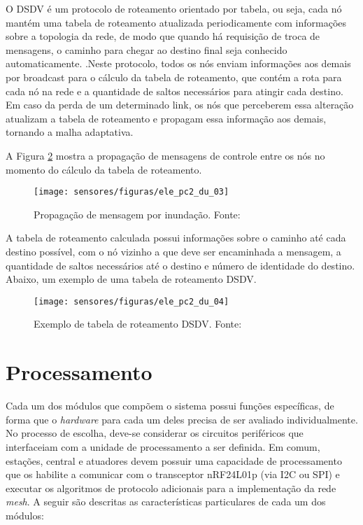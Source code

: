 O DSDV é um protocolo de roteamento orientado por tabela, ou seja, cada nó mantém uma tabela de roteamento atualizada periodicamente com informações sobre a topologia da rede, de modo que quando há requisição de troca de mensagens, o caminho para chegar ao destino final seja conhecido automaticamente.
\cite{bib_ele_du_3}.Neste protocolo, todos os nós enviam informações aos demais por broadcast para o cálculo da tabela de roteamento, que contém a rota para cada nó na rede e a quantidade de saltos necessários para atingir cada destino. Em caso da perda de um determinado link, os nós que perceberem essa alteração atualizam a tabela de roteamento e propagam essa informação aos demais, tornando a malha adaptativa.


A Figura \ref{ele_pc2_du_03} mostra a propagação de mensagens de controle entre os nós no momento do cálculo da tabela de roteamento.


\begin{figure}
\centering
\texttt{[image: sensores/figuras/ele\_pc2\_du\_03]}
\caption{Propagação de mensagem por inundação. Fonte:\cite{bib_ele_du_3}}
\label{ele_pc2_du_03}
\end{figure}


A tabela de roteamento calculada possui informações sobre o caminho até cada destino possível, com o nó vizinho a que deve ser encaminhada a mensagem, a quantidade de saltos necessários até o destino e número de identidade do destino. Abaixo, um exemplo de uma tabela de roteamento DSDV.



\begin{figure}
\centering
\texttt{[image: sensores/figuras/ele\_pc2\_du\_04]}
\caption{Exemplo de tabela de roteamento DSDV. Fonte:\cite{bib_ele_du_3}}
\label{ele_pc2_du_03}
\end{figure}


\section{Processamento}
		
	Cada um dos módulos que compõem o sistema possui funções específicas, de forma que o \emph{hardware} para cada um deles precisa de ser avaliado individualmente. No processo de escolha, deve-se considerar os circuitos periféricos que interfaceiam com a unidade de processamento a ser definida. Em comum, estações, central e atuadores devem possuir uma capacidade de processamento que os habilite a comunicar com o transceptor nRF24L01p (via I2C ou SPI) e executar os algoritmos de protocolo adicionais para a implementação da rede \emph{mesh}. A seguir são descritas as características particulares de cada um dos módulos:

